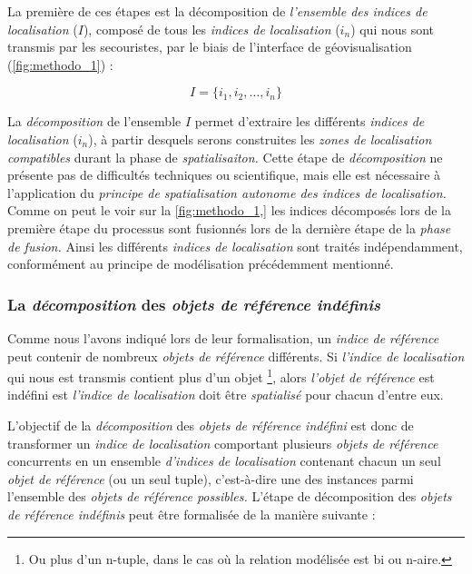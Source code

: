 La première de ces étapes est la décomposition de \emph{l'ensemble des
  indices de localisation} (\(I\)), composé de tous les \emph{indices
  de localisation} (\(i_n\)) qui nous sont transmis par les
secouristes, par le biais de l'interface de géovisualisation
(\autoref{fig:methodo_1}) :

\begin{equation}
  I = \{i_1, i_2, \dots, i_n \}
\end{equation}

La \emph{décomposition} de l'ensemble \(I\) permet d'extraire les
différents \emph{indices de localisation} (\(i_n\)), à partir desquels
serons construites les \emph{zones de localisation compatibles} durant
la phase de \emph{spatialisaiton.} Cette étape de \emph{décomposition}
ne présente pas de difficultés techniques ou scientifique, mais elle
est nécessaire à l’application du \emph{principe de spatialisation
  autonome des indices de localisation.} Comme on peut le voir sur la
\autoref{fig:methodo_1,} les indices décomposés lors de la première
étape du processus sont fusionnés lors de la dernière étape de la
\emph{phase de fusion.}  Ainsi les différents \emph{indices de
  localisation} sont traités indépendamment, conformément au principe
de modélisation précédemment mentionné.

\subsubsection{La \emph{décomposition} des \emph{objets de référence indéfinis}}

Comme nous l'avons indiqué lors de leur formalisation, un \emph{indice
  de référence} peut contenir de nombreux \emph{objets de référence}
différents. Si \emph{l'indice de localisation} qui nous est transmis
contient plus d'un objet \footnote{Ou plus d'un n-tuple, dans le cas
  où la relation modélisée est bi ou n-aire.}, alors \emph{l'objet de
  référence} est indéfini est \emph{l'indice de localisation} doit
être \emph{spatialisé} pour chacun d'entre eux.

L'objectif de la \emph{décomposition} des \emph{objets de référence
  indéfini} est donc de transformer un \emph{indice de localisation}
comportant plusieurs \emph{objets de référence} concurrents en un
ensemble \emph{d'indices de localisation} contenant chacun un seul
\emph{objet de référence} (ou un seul tuple), c'est-à-dire une des
instances parmi l'ensemble des \emph{objets de référence possibles.}
L'étape de décomposition des \emph{objets de référence indéfinis} peut
être formalisée de la manière suivante :


